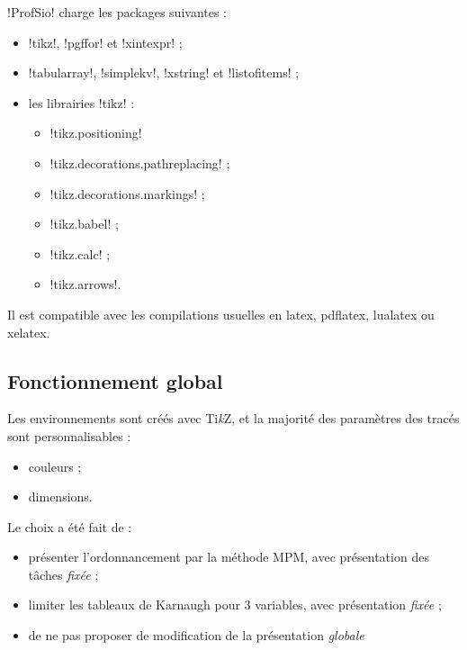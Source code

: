 \documentclass[french,a4paper,11pt]{article}
\providecommand\tikzlogo{Ti\textit{k}Z}
\let\TikZ\tikzlogo
\begin{document}
\begin{noteblock}
\packagetex!ProfSio! charge les packages suivantes :

\begin{itemize}
	\item \packagetex!tikz!, \packagetex!pgffor! et \packagetex!xintexpr! ;
	\item \packagetex!tabularray!, \packagetex!simplekv!, \packagetex!xstring! et \packagetex!listofitems! ;
	\item les librairies \packagetex!tikz! :
	\begin{itemize}
		\item \motcletex!tikz.positioning!
		\item \motcletex!tikz.decorations.pathreplacing! ;
		\item \motcletex!tikz.decorations.markings! ;
		\item \motcletex!tikz.babel! ;
		\item \motcletex!tikz.calc! ;
		\item \motcletex!tikz.arrows!.
	\end{itemize}
\end{itemize}

Il est compatible avec les compilations usuelles en \textsf{latex}, \textsf{pdflatex}, \textsf{lualatex} ou \textsf{xelatex}.
\end{noteblock}

\subsection{Fonctionnement global}

\begin{tipblock}
Les environnements sont créés avec \TikZ, et la majorité des paramètres des tracés sont personnalisables :

\begin{itemize}
	\item couleurs ;
	\item dimensions.
\end{itemize}
\vspace*{-\baselineskip}\leavevmode
\end{tipblock}

\begin{noteblock}
Le choix a été fait de :

\begin{itemize}
	\item présenter l'ordonnancement par la méthode MPM, avec présentation des tâches \textit{fixée} ;
	\item limiter les tableaux de Karnaugh pour 3 variables, avec présentation \textit{fixée} ;
	\item de ne pas proposer de modification de la présentation \textit{globale}
\end{itemize}
\vspace*{-\baselineskip}\leavevmode
\end{noteblock}
\end{document}
